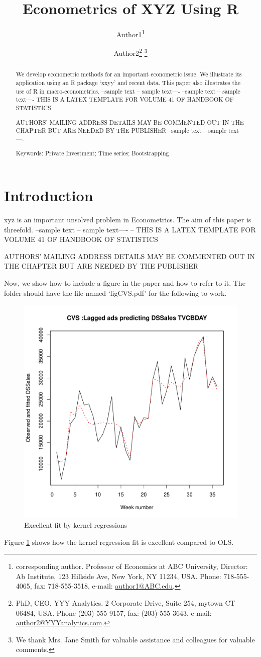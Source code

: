 \documentclass[12pt]{article}
\title{Econometrics of XYZ Using R}
\author{ {Author1}\footnote{corresponding author. 
 Professor of Economics at ABC University, 
Director:  Ab Institute, 123 Hillside Ave, New York, NY 11234, USA. Phone: 718-555-4065, fax: 718-555-3518, e-mail: \url{author1@ABC.edu}.} 
\and 
{Author2}\footnote{PhD, CEO, YYY Analytics. 2 Corporate Drive, Suite 254, mytown CT 06484, USA. Phone (203) 555 9157, fax: (203) 555 3643, e-mail: \url{author2@YYYanalytics.com}.}
\thanks{We thank Mrs. Jane Smith for valuable assistance and colleagues for valuable comments.} 
} %
\begin{document}
\maketitle

\begin{abstract}
We develop econometric methods for an  important
econometric issue.
We illustrate its application using an R package `xxyy'
and recent data.
This paper also illustrates the use of R in macro-econometrics.
--sample text -- sample text----
--sample text -- sample text----
THIS IS A LATEX TEMPLATE FOR VOLUME 41 OF HANDBOOK OF STATISTICS


AUTHORS' MAILING ADDRESS DETAILS MAY BE COMMENTED OUT IN THE CHAPTER
 BUT ARE NEEDED BY THE PUBLISHER
 --sample text -- sample text----

\bigskip

Keywords: Private Investment; Time series; Bootstrapping


\end{abstract}

\section{Introduction}
xyz is an important unsolved problem in Econometrics.
The aim of this paper is threefold.
--sample text -- sample text----
--
THIS IS A LATEX TEMPLATE FOR VOLUME 41 OF HANDBOOK OF STATISTICS

AUTHORS' MAILING  ADDRESS DETAILS MAY BE COMMENTED OUT IN THE CHAPTER BUT ARE NEEDED BY THE PUBLISHER

Now, we show how to include a figure in the paper and
how to refer to it.  The folder should have the 
file named `figCVS.pdf' for the following to work.

\begin{figure}[ht!]
\centering 
\includegraphics[width=1\textwidth]{figCVS.pdf}
\caption{Excellent fit by kernel regressions}
\label{fig.fit}
\end{figure}
Figure  \ref{fig.fit} shows how the kernel regression fit is
excellent compared to OLS.
\end{document}
